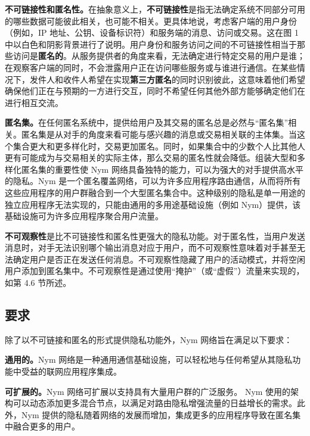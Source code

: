 \documentclass{article}
\begin{document}
	\textbf{不可链接性和匿名性。}在抽象意义上，\textbf{不可链接性}是指无法确定系统不同部分可用的哪些数据可能彼此相关，也可能不相关\cite{ref87}。更具体地说，考虑客户端的用户身份（例如，IP 地址、公钥、设备标识符）和服务端的消息、访问或交易。这在图 1 中以白色和阴影背景进行了说明。用户身份和服务访问之间的不可链接性相当于那些访问是\textbf{匿名的}。从服务提供者的角度来看，无法确定进行特定交易的用户是谁；在观察客户端的同时，不会泄露用户正在访问哪些服务或与谁进行通信。在某些情况下，发件人和收件人希望在实现\textbf{第三方匿名}的同时识别彼此，这意味着他们希望确保他们正在与预期的一方进行交互，同时不希望任何其他外部方能够确定他们在进行相互交流。\newline

	\textbf{匿名集。}在任何匿名系统中，提供给用户及其交易的匿名总是必然与“匿名集”相关\cite{ref87}。匿名集是从对手的角度来看可能与感兴趣的消息或交易相关联的主体集。当这个集合更大和更多样化时，交易更加匿名。同时，如果集合中的少数个人比其他人更有可能成为与交易相关的实际主体，那么交易的匿名性就会降低\cite{ref38, ref94}。组装大型和多样化匿名集的重要性使 Nym 网络具备独特的能力，可以为强大的对手提供高水平的隐私。Nym 是一个匿名覆盖网络，可以为许多应用程序路由通信，从而将所有这些应用程序的用户群融合到一个大型匿名集合中。这种级别的隐私是单一用途的独立应用程序无法实现的，只能由通用的多用途基础设施（例如 Nym）提供，该基础设施可为许多应用程序聚合用户流量。\newline

	\textbf{不可观察性}是比不可链接性和匿名性更强大的隐私功能。对于匿名性，当用户发送消息时，对手无法识别哪个输出消息对应于用户，而不可观察性意味着对手甚至无法确定用户是否正在发送任何消息。不可观察性隐藏了用户的活动模式，并将空闲用户添加到匿名集中。不可观察性是通过使用“掩护”（或“虚假”）流量来实现的，如第 4.6 节所述。\newline

	\subsection{要求}

	除了以不可链接和匿名的形式提供隐私功能外，Nym 网络旨在满足以下要求：\newline

	\textbf{通用的。}Nym 网络是一种通用通信基础设施，可以轻松地与任何希望从其隐私功能中受益的联网应用程序集成。\newline

	\textbf{可扩展的。}Nym 网络可扩展以支持具有大量用户群的广泛服务。 Nym 使用的架构可以动态添加更多混合节点，以满足对路由隐私增强流量的日益增长的需求。此外，Nym 提供的隐私随着网络的发展而增加，集成更多的应用程序导致在匿名集中融合更多的用户。\newline
\end{document}
